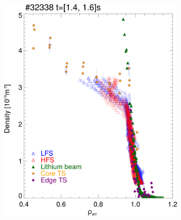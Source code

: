 \documentclass[12pt]{iopart}
\begin{document}
\begin{figure}[!hbt]
\centering
	\begin{subfigure}{3in}
    \includegraphics[scale=0.5]{augped_32338.png}
	\caption*{}
	\end{subfigure}
	~
	\begin{subfigure}{3in}

\end{subfigure}
\end{figure}
\end{document}
